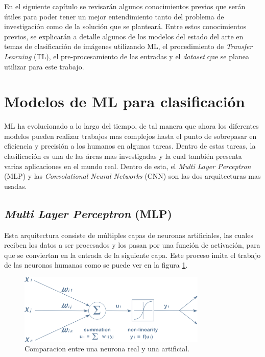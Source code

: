 En el siguiente capítulo se revisarán algunos conocimientos previos 
que serán útiles para poder tener un mejor entendimiento tanto del 
problema de investigación como de la solución que se planteará. 
Entre estos conocimientos previos, se explicarán a detalle algunos 
de los modelos del estado del arte en temas de clasificación de 
imágenes utilizando ML, el procedimiento de \textit{Transfer Learning} (TL), 
el pre-procesamiento de las entradas y el \textit{dataset} que se 
planea utilizar para este trabajo.\\

\section{Modelos de ML para clasificación}

ML ha evolucionado a lo largo del tiempo, de tal manera que ahora los 
diferentes modelos pueden realizar trabajos mas complejos hasta el 
punto de sobrepasar en eficiencia y precisión a los humanos en algunas 
tareas. Dentro de estas tareas, la clasificación es una de las 
áreas mas investigadas y la cual también presenta varias aplicaciones 
en el mundo real. Dentro de esta, el 
\textit{Multi Layer Perceptron} (MLP) y las 
\textit{Convolutional Neural Networks} (CNN) son las dos arquitecturas 
mas usadas.

\subsection{\textit{Multi Layer Perceptron} (MLP)}

Esta arquitectura consiste de múltiples 
capas de neuronas artificiales, las cuales reciben los datos a ser 
procesados y los pasan por una función de activación, para 
que se conviertan en la entrada de la siguiente capa. Este proceso imita 
el trabajo de las neuronas humanas como se puede ver en la figura 
\ref{neurona}. \\

\begin{figure}[h!]
\includegraphics[width=0.8\textwidth]{images/comparacion_neuronas.jpg}
\centering
\caption{Comparacion entre una neurona real y una artificial\protect\cite{neuronas}.}
\label{neurona}
\end{figure}

